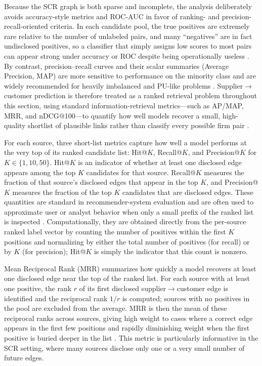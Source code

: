 Because the SCR graph is both sparse and incomplete, the analysis deliberately avoids accuracy-style metrics and ROC-AUC in favor of ranking- and precision-recall-oriented criteria. In each candidate pool, the true positives are extremely rare relative to the number of unlabeled pairs, and many ``negatives'' are in fact undisclosed positives, so a classifier that simply assigns low scores to most pairs can appear strong under accuracy or ROC despite being operationally useless \parencite{elkan_learning_2008,davis_relationship_2006,saito_precision-recall_2015}. By contrast, precision--recall curves and their scalar summaries (Average Precision, MAP) are more sensitive to performance on the minority class and are widely recommended for heavily imbalanced and PU-like problems \parencite{davis_relationship_2006,saito_precision-recall_2015,manning_introduction_2008}. Supplier$\rightarrow$customer prediction is therefore treated as a ranked retrieval problem throughout this section, using standard information-retrieval metrics---such as AP/MAP, MRR, and nDCG@100---to quantify how well models recover a small, high-quality shortlist of plausible links rather than classify every possible firm pair \parencite{shani_evaluating_2011}.

For each source, three short-list metrics capture how well a model performs at the very top of its ranked candidate list: Hit@$K$, Recall@$K$, and Precision@$K$ for $K \in \{1,10,50\}$. Hit@$K$ is an indicator of whether at least one disclosed edge appears among the top $K$ candidates for that source. Recall@$K$ measures the fraction of that source's disclosed edges that appear in the top $K$, and Precision@$K$ measures the fraction of the top $K$ candidates that are disclosed edges. These quantities are standard in recommender-system evaluation and are often used to approximate user or analyst behavior when only a small prefix of the ranked list is inspected \parencite{herlocker_evaluating_2004,shani_evaluating_2011}. Computationally, they are obtained directly from the per-source ranked label vector by counting the number of positives within the first $K$ positions and normalizing by either the total number of positives (for recall) or by $K$ (for precision); Hit@$K$ is simply the indicator that this count is nonzero.

Mean Reciprocal Rank (MRR) summarizes how quickly a model recovers at least one disclosed edge near the top of the ranked list. For each source with at least one positive, the rank $r$ of its first disclosed supplier$\to$customer edge is identified and the reciprocal rank $1/r$ is computed; sources with no positives in the pool are excluded from the average. MRR is then the mean of these reciprocal ranks across sources, giving high weight to cases where a correct edge appears in the first few positions and rapidly diminishing weight when the first positive is buried deeper in the list \parencite{manning_introduction_2008,shani_evaluating_2011}. This metric is particularly informative in the SCR setting, where many sources disclose only one or a very small number of future edges.

